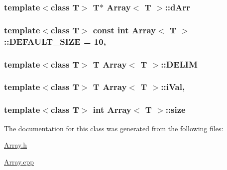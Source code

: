 \subsubsection[{\texorpdfstring{d\+Arr}{dArr}}]{\setlength{\rightskip}{0pt plus 5cm}template$<$class T$>$ T$\ast$ {\bf Array}$<$ T $>$\+::d\+Arr\hspace{0.3cm}{\ttfamily [private]}}\hypertarget{classArray_ae2ca81aaef91da786ef75936184a178a}{}\label{classArray_ae2ca81aaef91da786ef75936184a178a}
\subsubsection[{\texorpdfstring{D\+E\+F\+A\+U\+L\+T\+\_\+\+S\+I\+ZE}{DEFAULT_SIZE}}]{\setlength{\rightskip}{0pt plus 5cm}template$<$class T$>$ const int {\bf Array}$<$ T $>$\+::D\+E\+F\+A\+U\+L\+T\+\_\+\+S\+I\+ZE = 10\hspace{0.3cm}{\ttfamily [static]}, {\ttfamily [private]}}\hypertarget{classArray_a2fd6afd4cbdf9f82047ec1592d655f9a}{}\label{classArray_a2fd6afd4cbdf9f82047ec1592d655f9a}
\subsubsection[{\texorpdfstring{D\+E\+L\+IM}{DELIM}}]{\setlength{\rightskip}{0pt plus 5cm}template$<$class T$>$ T {\bf Array}$<$ T $>$\+::D\+E\+L\+IM\hspace{0.3cm}{\ttfamily [private]}}\hypertarget{classArray_ab425400868a291283a14fc228a344bf0}{}\label{classArray_ab425400868a291283a14fc228a344bf0}
\subsubsection[{\texorpdfstring{i\+Val}{iVal}}]{\setlength{\rightskip}{0pt plus 5cm}template$<$class T$>$ T {\bf Array}$<$ T $>$\+::i\+Val\hspace{0.3cm}{\ttfamily [static]}, {\ttfamily [private]}}\hypertarget{classArray_a0aae993b8d3286cb4e8841cd71e1bb78}{}\label{classArray_a0aae993b8d3286cb4e8841cd71e1bb78}
\subsubsection[{\texorpdfstring{size}{size}}]{\setlength{\rightskip}{0pt plus 5cm}template$<$class T$>$ int {\bf Array}$<$ T $>$\+::size\hspace{0.3cm}{\ttfamily [private]}}\hypertarget{classArray_a1e2031821065f3fb9bfada13e2d6ab43}{}\label{classArray_a1e2031821065f3fb9bfada13e2d6ab43}


The documentation for this class was generated from the following files\+:\begin{DoxyCompactItemize}
\item 
\hyperlink{Array_8h}{Array.\+h}\item 
\hyperlink{Array_8cpp}{Array.\+cpp}\end{DoxyCompactItemize}

